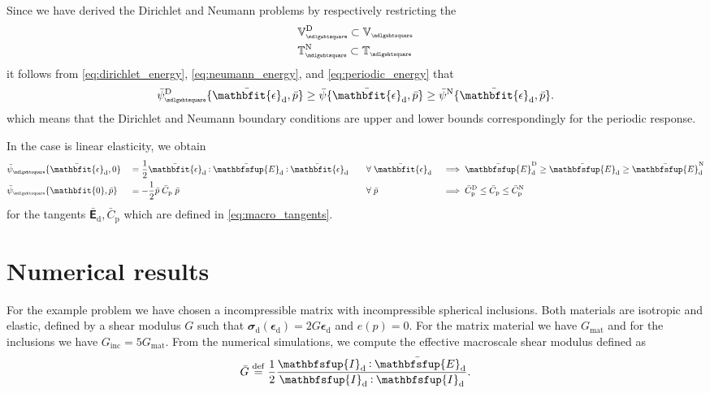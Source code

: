 \documentclass[12pt,a4paper]{article}
\renewcommand{\ts}[1]{\mathbfit{#1}}
\renewcommand{\tf}[1]{\mathbfsfup{#1}}
\renewcommand{\Box}{\mdlgwhtsquare}
\renewcommand{\dev}{\mathrm{d}}
\newcommand{\ded}{\mathrm{d}}
\newcommand{\dep}{\mathrm{p}}
\newcommand{\rve}{
  {\mathchoice
   {\mbox{\scalebox{0.67}{$\Box$}}}
   {\mbox{\scalebox{0.67}{$\Box$}}}
   {\mbox{\scalebox{0.5}{$\Box$}}}
   {\mbox{\scalebox{0.375}{$\Box$}}}
  }
}
\begin{document}
Since we have derived the Dirichlet and Neumann problems by respectively restricting the 
\begin{align}
 &\set{V}_\rve^\Dirichlet \subset \set{V}_\rve\\
 &\set{T}_\rve^\Neumann \subset \set{T}_\rve
\end{align}
it follows from \eqref{eq:dirichlet_energy}, \eqref{eq:neumann_energy}, and \eqref{eq:periodic_energy} that
\begin{align}
 \bar\psi^\Dirichlet_\rve\{\bar{\ts\epsilon}_\dev, \bar{p}\} \geq \bar\psi\{\bar{\ts\epsilon}_\dev, \bar {p}\} \geq \bar\psi^\Neumann\{\bar{\ts\epsilon}_\dev, \bar {p}\}.
\end{align}
which means that the Dirichlet and Neumann boundary conditions are upper and lower bounds correspondingly for the periodic response.

In the case is linear elasticity, we obtain
\begin{alignat}{4}
 &\bar{\psi}_\rve\{\bar{\ts\epsilon}_\dev, 0\} &&= \frac12 \bar{\ts\epsilon}_\dev \dprod \bar{\tf E}_{\ded}\dprod \bar{\ts\epsilon}_\dev %
&\quad&\forall\;\bar{\ts\epsilon}_\dev &&\implies
 \bar{\tf E}_{\ded}^\Dirichlet \geq \bar{\tf E}_{\ded} \geq \bar{\tf E}_{\ded}^\Neumann
\\
 &\bar{\psi}_\rve\{\ts 0, \bar{p}\} &&= -\frac12 \bar{p}\;\bar{C}_{\dep}\;\bar{p} %
&\quad&\forall\;\bar{p} &&\implies
 \bar{C}_\dep^\Dirichlet \leq \bar{C}_\dep \leq \bar{C}_\dep^\Neumann
\end{alignat}
for the tangents $\bar{\tf E}_\ded, \bar{C}_\dep$ which are defined in \eqref{eq:macro_tangents}.



\section{Numerical results}
For the example problem we have chosen a incompressible matrix with incompressible spherical inclusions.
Both materials are isotropic and elastic, defined  by a shear modulus $G$ such that $\ts\sigma_\dev(\ts\epsilon_\dev) = 2 G \ts\epsilon_\dev$ and $e(p) = 0$.
For the matrix material we have $G_\mathrm{mat}$ and for the inclusions we have $G_\mathrm{inc} = 5 G_\mathrm{mat}$.
From the numerical simulations, we compute the effective macroscale shear modulus defined as
\begin{align}
 \bar{G} \defeq \frac12 \frac{\tf I_\dev \dprod \bar{\tf E}_\dev}{\tf I_\dev \dprod \tf I_\dev}.
\end{align}
\end{document}
